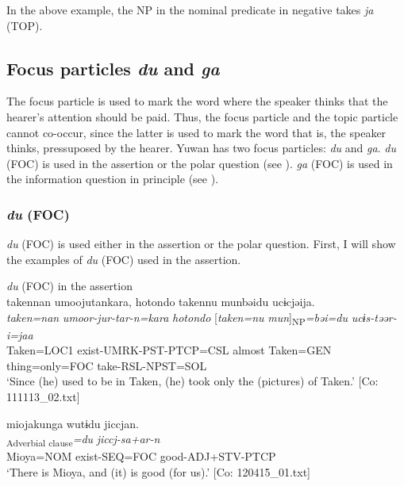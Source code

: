 In the above example, the NP in the nominal predicate in negative takes \textit{ja} (TOP).

\subsection{Focus particles \textit{du} and \textit{ga}}\label{sec:10.1.2}

The focus particle is used to mark the word where the speaker thinks that the hearer’s attention should be paid. Thus, the focus particle and the topic particle cannot co-occur, since the latter is used to mark the word that is, the speaker thinks, pressuposed by the hearer. Yuwan has two focus particles: \textit{du} and \textit{ga}. \textit{du} (FOC) is used in the assertion or the polar question (see ). \textit{ga} (FOC) is used in the information question in principle (see ).

\subsubsection{\textit{du} (FOC)}\label{sec:10.1.2.1}

\textit{du} (FOC) is used either in the assertion or the polar question. First, I will show the examples of \textit{du} (FOC) used in the assertion.

\ea\label{ex:10.9}   \textit{du} (FOC) in the assertion\\
  \ea  %
      \glll    takennan  umoojutankara,  {\textbar}hotondo{\textbar}  takennu   munbəidu  ucɨcjəija.\\
      \textit{taken=nan}  \textit{umoor-jur-tar-n=kara}  \textit{hotondo}  [\textit{taken=nu} \textit{mun}]\textsubscript{NP}\textit{=bəi=du}  \textit{ucɨs-təər-i=jaa}\\
      Taken=LOC1  exist-UMRK-PST-PTCP=CSL  almost  Taken=GEN   thing=only=FOC  take-RSL-NPST=SOL\\
      \glt       ‘Since (he) used to be in Taken, (he) took only the (pictures) of Taken.’ [Co: 111113\_02.txt]

  \ex  %
      \glll    miojakunga  wutɨdu  jiccjan.\\
      [\textit{miojakun=ga}  \textit{wur-tɨ}]\textsubscript{Adverbial clause}\textit{=du}  \textit{jiccj-sa+ar-n}\\
      Mioya=NOM  exist-SEQ=FOC  good-ADJ+STV-PTCP\\
      \glt       ‘There is Mioya, and (it) is good (for us).’ [Co: 120415\_01.txt]

